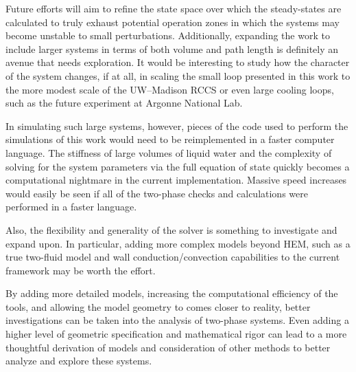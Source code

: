\documentclass{UWMadThesis}
\begin{document}
Future efforts will aim to refine the state space over which the steady-states are calculated to truly exhaust potential operation zones in which the systems may become unstable to small perturbations.
Additionally, expanding the work to include larger systems in terms of both volume and path length is definitely an avenue that needs exploration.
It would be interesting to study how the character of the system changes, if at all, in scaling the small loop presented in this work to the more modest scale of the UW--Madison RCCS or even large cooling loops, such as the future experiment at Argonne National Lab.

In simulating such large systems, however, pieces of the code used to perform the simulations of this work would need to be reimplemented in a faster computer language.
The stiffness of large volumes of liquid water and the complexity of solving for the system parameters via the full equation of state quickly becomes a computational nightmare in the current implementation.
Massive speed increases would easily be seen if all of the two-phase checks and calculations were performed in a faster language.

Also, the flexibility and generality of the solver is something to investigate and expand upon.
In particular, adding more complex models beyond HEM, such as a true two-fluid model and wall conduction/convection capabilities to the current framework may be worth the effort.

By adding more detailed models, increasing the computational efficiency of the tools, and allowing the model geometry to comes closer to reality, better investigations can be taken into the analysis of two-phase systems.
Even adding a higher level of geometric specification and mathematical rigor can lead to a more thoughtful derivation of models and consideration  of other methods to better analyze and explore these systems.










    \cleardoublepage
    
    
\end{document}
